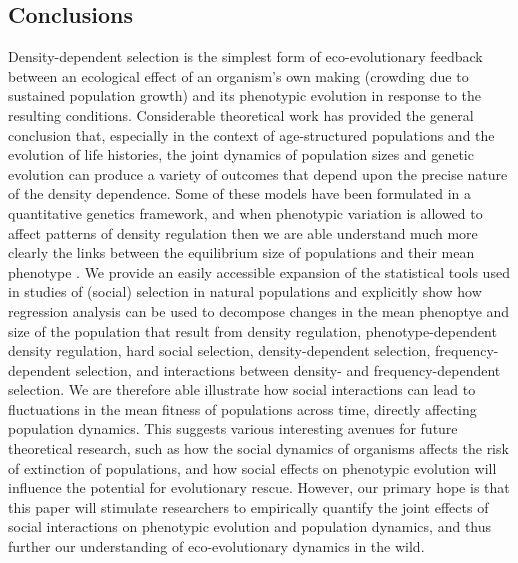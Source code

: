 \documentclass{article}
\begin{document}
\subsection{Conclusions}
Density-dependent selection is the simplest form of eco-evolutionary feedback between an ecological effect of an organism’s own making (crowding due to sustained population growth) and its phenotypic evolution in response to the resulting conditions. Considerable theoretical work has provided the general conclusion that, especially in the context of age-structured populations and the evolution of life histories, the joint dynamics of population sizes and genetic evolution can produce a variety of outcomes that depend upon the precise nature of the density dependence. Some of these models have been formulated in a quantitative genetics framework, and when phenotypic variation is allowed to affect patterns of density regulation then we are able understand much more clearly the links between the equilibrium size of populations and their mean phenotype \citep{Engen2020}. We provide an easily accessible expansion of the statistical tools used in studies of (social) selection in natural populations and explicitly show how regression analysis can be used to decompose changes in the mean phenoptye and size of the population that result from density regulation, phenotype-dependent density regulation, hard social selection, density-dependent selection, frequency-dependent selection, and interactions between density- and frequency-dependent selection. We are therefore able illustrate how social interactions can lead to fluctuations in the mean fitness of populations across time, directly affecting population dynamics. This suggests various interesting avenues for future theoretical research, such as how the social dynamics of organisms affects the risk of extinction of populations, and how social effects on phenotypic evolution will influence the potential for evolutionary rescue. However, our primary hope is that this paper will stimulate researchers to empirically quantify the joint effects of social interactions on phenotypic evolution and population dynamics, and thus further our understanding of eco-evolutionary dynamics in the wild.



  
\end{document}
